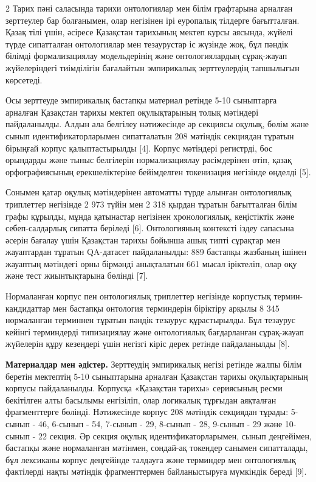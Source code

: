 \begin{multicols}{2}
Тарих пәні саласында тарихи онтологиялар мен білім графтарына арналған
зерттеулер бар болғанымен, олар негізінен ірі еуропалық тілдерге
бағытталған. Қазақ тілі үшін, әсіресе Қазақстан тарихының мектеп курсы
аясында, жүйелі түрде сипатталған онтологиялар мен тезаурустар іс
жүзінде жоқ, бұл пәндік білімді формализациялау модельдерінің және
онтологиялардың сұрақ-жауап жүйелеріндегі тиімділігін бағалайтын
эмпирикалық зерттеулердің тапшылығын көрсетеді.

Осы зерттеуде эмпирикалық бастапқы материал ретінде 5-10 сыныптарға
арналған Қазақстан тарихы мектеп оқулықтарының толық мәтіндері
пайдаланылды. Алдын ала белгілеу нәтижесінде әр секциясы оқулық, бөлім
және сынып идентификаторларымен сипатталатын 208 мәтіндік секциядан
тұратын бірыңғай корпус қалыптастырылды {[}4{]}. Корпус мәтіндері
регистрді, бос орындарды және тыныс белгілерін нормализациялау
рәсімдерінен өтіп, қазақ орфографиясының ерекшеліктеріне бейімделген
токенизация негізінде өңделді {[}5{]}.

Сонымен қатар оқулық мәтіндерінен автоматты түрде алынған онтологиялық
триплеттер негізінде 2 973 түйін мен 2 318 қырдан тұратын бағытталған
білім графы құрылды, мұнда қатынастар негізінен хронологиялық,
кеңістіктік және себеп-салдарлық сипатта беріледі {[}6{]}. Онтологияның
контексті іздеу сапасына әсерін бағалау үшін Қазақстан тарихы бойынша
ашық типті сұрақтар мен жауаптардан тұратын QA-датасет пайдаланылды: 889
бастапқы жазбаның ішінен жауаптың мәтіндегі орны бірмәнді анықталатын
661 мысал іріктеліп, олар оқу және тест жиынтықтарына бөлінді {[}7{]}.

Нормаланған корпус пен онтологиялық триплеттер негізінде корпустық
термин-кандидаттар мен бастапқы онтология терминдерін біріктіру арқылы 8
345 нормаланған терминнен тұратын пәндік тезаурус құрастырылды. Бұл
тезаурус кейінгі терминдерді типизациялау және онтологиялық бағдарланған
сұрақ-жауап жүйелерін құру кезеңдері үшін негізгі кіріс дерек ретінде
пайдаланылды {[}8{]}.

{\bfseries Материалдар мен әдістер.} Зерттеудің эмпирикалық негізі ретінде
жалпы білім беретін мектептің 5-10 сыныптарына арналған Қазақстан тарихы
оқулықтарының корпусы пайдаланылды. Корпусқа «Қазақстан тарихы»
сериясының ресми бекітілген алты басылымы енгізіліп, олар логикалық
тұрғыдан аяқталған фрагменттерге бөлінді. Нәтижесінде корпус 208
мәтіндік секциядан тұрады: 5-сынып - 46, 6-сынып - 54, 7-сынып - 29,
8-сынып - 28, 9-сынып - 29 және 10-сынып - 22 секция. Әр секция оқулық
идентификаторларымен, сынып деңгейімен, бастапқы және нормаланған
мәтінмен, сондай-ақ токендер санымен сипатталады, бұл лексиканы корпус
деңгейінде талдауға және терминдер мен онтологиялық фактілерді нақты
мәтіндік фрагменттермен байланыстыруға мүмкіндік береді {[}9{]}.


\end{multicols}
